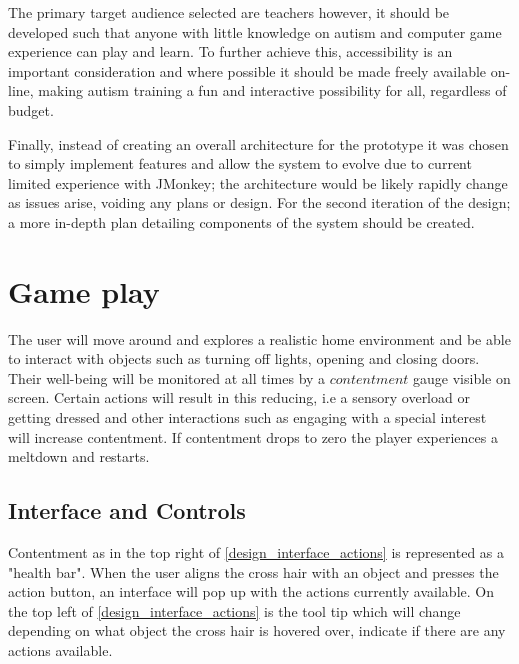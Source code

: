 \documentclass[11pt]{report}
\begin{document}
The primary target audience selected are teachers however, it should be developed such that anyone with little knowledge on autism and computer game experience can play and learn. To further achieve this, accessibility is an important consideration and where possible it should be made freely available on-line, making autism training a fun and interactive possibility for all, regardless of budget.  

Finally, instead of creating an overall architecture for the prototype it was chosen to simply implement features and allow the system to evolve due to current limited experience with JMonkey; the architecture would be likely rapidly change as issues arise, voiding any plans or design. For the second iteration of the design; a more in-depth plan detailing components of the system should be created.

\section{Game play}

The user will move around and explores a realistic home environment and be able to interact with objects such as turning off lights, opening and closing doors. Their well-being will be monitored at all times by a $contentment$ gauge visible on screen. Certain actions will result in this reducing, i.e a sensory overload or getting dressed and other interactions such as engaging with a special interest will increase contentment. If contentment drops to zero the player experiences a meltdown and restarts. 

\subsection{Interface and Controls}

Contentment as in the top right of \ref{design_interface_actions} is represented as a "health bar". When the user aligns the cross hair with an object and presses the action button, an interface will pop up with the actions currently available. On the top left of \ref{design_interface_actions} is the tool tip which will change depending on what object the cross hair is hovered over, indicate if there are any actions available. 
\end{document}
